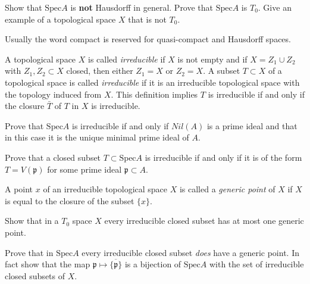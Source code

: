 \begin{exercise}
Show that $\text{Spec} A$ is {\bf not} Hausdorff in general.
Prove that $\text{Spec} A$ is $T_0$. Give an example of a topological
space $X$ that is not $T_0$.
\end{exercise}

\begin{remark}
Usually the word compact is reserved for quasi-compact and
Hausdorff spaces.
\end{remark}

\begin{definition}
A topological space $X$ is called {\it irreducible} if $X$ is not empty
and if $X=Z_1\cup Z_2$ with $Z_1, Z_2\subset X$ closed, then either
$Z_1=X$ or $Z_2=X$. A subset $T\subset X$ of a topological space
is called {\it irreducible} if it is an irreducible
topological space with the topology induced from $X$. 
This definition implies $T$ is irreducible if and only 
if the closure $\bar T$ of $T$ in $X$ is irreducible.
\end{definition}

\begin{exercise}
Prove that $\text{Spec} A$ is irreducible if and only if
$Nil(A)$ is a prime ideal and that in this case it is the unique
minimal prime ideal of $A$.
\end{exercise}

\begin{exercise}
Prove that a closed subset $T\subset \text{Spec} A$
is irreducible if and only if it is of the form $T=V({\mathfrak p})$ for 
some prime ideal ${\mathfrak p}\subset A$.
\end{exercise}

\begin{definition}
A point $x$ of an irreducible topological space $X$ is called
a {\it generic point} of $X$ if $X$ is equal to the closure of 
the subset $\{x\}$.
\end{definition}

\begin{exercise}
Show that in a $T_0$ space $X$ every irreducible closed
subset has at most one generic point. 
\end{exercise}

\begin{exercise}
Prove that in $\text{Spec} A$ every
irreducible closed subset {\it does} have a generic point.
In fact show that the map
${\mathfrak p} \mapsto \overline{\{{\mathfrak p}\}}$ is
a bijection of $\text{Spec} A$ with the set of irreducible closed
subsets of $X$.
\end{exercise}

